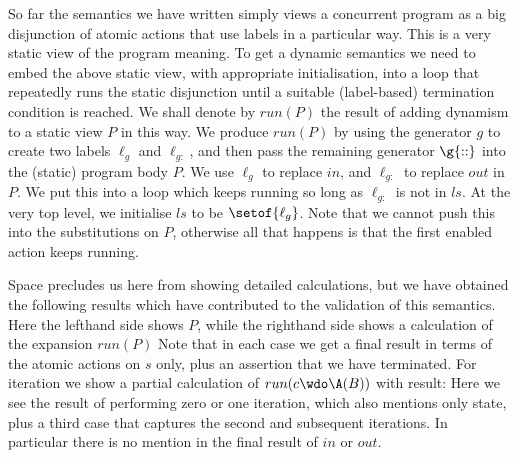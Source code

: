 So far the semantics we have written simply views a concurrent program
as a big disjunction of atomic actions that use labels in a particular way.
This is a very static view of the program meaning.
To get a dynamic semantics we need to embed the above static
view, with appropriate initialisation,
into a loop that repeatedly runs the static disjunction
until a suitable (label-based) termination condition is reached.
We shall denote by $run(P)$ the result of adding dynamism
to a static view $P$ in this way.
We produce $run(P)$ by using the generator $g$
to create two labels $\ell_g$ and $\ell_{g:}$,
and then pass the remaining generator $\g{::}$
into the (static) program body $P$.
We use $\ell_g$ to replace $in$,
and $\ell_{g:}$ to replace $out$ in $P$.
We put this into a loop which keeps running so long as $\ell_{g:}$
is not in $ls$.
At the very top level, we initialise $ls$ to be $\setof{\ell_g}$.
Note that we cannot push this into the substitutions on $P$,
otherwise all that happens is that the first enabled action keeps running.

Space precludes us here from showing detailed calculations,
but we have obtained the following results which have
contributed to the validation of this semantics.
Here the lefthand side shows $P$, while the righthand side
shows a calculation of the expansion $run(P)$
Note that in each case we get a final result in terms of the
atomic actions on $s$ only,
plus an assertion that we have terminated.
For iteration we show a partial calculation
of $run(c \wdo \A(B))$ with result:
Here we see the result
of performing zero or one iteration, which also mentions only state,
plus a third case that captures the second and subsequent iterations.
In particular there is no mention in the final result of $in$ or $out$.

